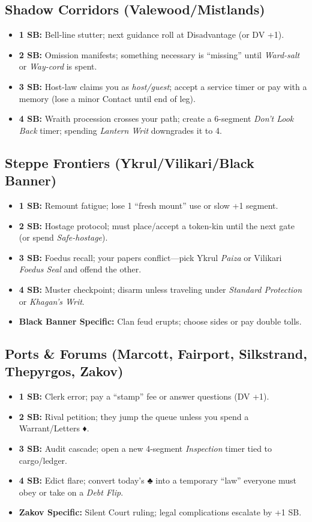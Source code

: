 \documentclass[12pt,oneside]{book}
\renewcommand{\clubsuit}{♣}
\renewcommand{\diamondsuit}{♦}
\begin{document}
\subsection{Shadow Corridors (Valewood/Mistlands)}
\begin{itemize}
  \item \textbf{1 SB:} Bell-line stutter; next guidance roll at Disadvantage (or DV +1).
  \item \textbf{2 SB:} Omission manifests; something necessary is ``missing'' until \emph{Ward-salt} or \emph{Way-cord} is spent.
  \item \textbf{3 SB:} Host-law claims you as \emph{host/guest}; accept a service timer or pay with a memory (lose a minor Contact until end of leg).
  \item \textbf{4 SB:} Wraith procession crosses your path; create a 6-segment \emph{Don't Look Back} timer; spending \emph{Lantern Writ} downgrades it to 4.
\end{itemize}

\subsection{Steppe Frontiers (Ykrul/Vilikari/Black Banner)}
\begin{itemize}
  \item \textbf{1 SB:} Remount fatigue; lose 1 ``fresh mount'' use or slow +1 segment.
  \item \textbf{2 SB:} Hostage protocol; must place/accept a token-kin until the next gate (or spend \emph{Safe-hostage}).
  \item \textbf{3 SB:} Foedus recall; your papers conflict---pick Ykrul \emph{Paiza} or Vilikari \emph{Foedus Seal} and offend the other.
  \item \textbf{4 SB:} Muster checkpoint; disarm unless traveling under \emph{Standard Protection} or \emph{Khagan's Writ}.
  \item \textbf{Black Banner Specific:} Clan feud erupts; choose sides or pay double tolls.
\end{itemize}

\subsection{Ports \& Forums (Marcott, Fairport, Silkstrand, Thepyrgos, Zakov)}
\begin{itemize}
  \item \textbf{1 SB:} Clerk error; pay a ``stamp'' fee or answer questions (DV +1).
  \item \textbf{2 SB:} Rival petition; they jump the queue unless you spend a Warrant/Letters \diamondsuit{}.
  \item \textbf{3 SB:} Audit cascade; open a new 4-segment \emph{Inspection} timer tied to cargo/ledger.
  \item \textbf{4 SB:} Edict flare; convert today's \clubsuit{} into a temporary ``law'' everyone must obey or take on a \emph{Debt Flip}.
  \item \textbf{Zakov Specific:} Silent Court ruling; legal complications escalate by +1 SB.
\end{itemize}
\end{document}
